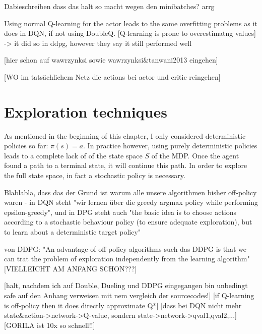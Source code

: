 Dabieschreiben dass das halt so macht wegen den minibatches? arrg

Using normal Q-learning for the actor leads to the same overfitting problems as it does in DQN, if not using DoubleQ. [Q-learning is prone to overestimatng values] -> it did so in ddpg, however they say it still performed well

[hier schon auf wawrzynksi sowie wawrzynksi\&tanwani2013 eingehen]

[WO im tatsächlichem Netz die actions bei actor und critic reingehen]


\section{Exploration techniques}

As mentioned in the beginning of this chapter, I only considered deterministic policies so far: $\pi(s) = a$. In practice however, using purely deterministic policies leads to a complete lack of  of the state space $S$ of the MDP. Once the agent found a path to a terminal state, it will continue  this path. In order to explore the full state space, in fact a stochastic policy is necessary.

Blablabla, dass das der Grund ist warum alle unsere algorithmen bisher off-policy waren - in DQN steht "wir lernen über die greedy argmax policy while performing epsilon-greedy", und in DPG steht auch "the basic idea is to choose actions according to a stochastic behaviour policy (to ensure adequate exploration), but to learn about a deterministic target policy"

von DDPG: "An advantage of off-policy algorithms such das DDPG is that we can trat the problem of exploration independently from the learning algorithm" [VIELLEICHT AM ANFANG SCHON???]



[halt, nachdem ich auf Double, Dueling und DDPG eingegangen bin unbedingt safe auf den Anhang verweisen mit nem vergleich der sourcecodes!]
[if Q-learning is off-policy then it does directly approximate Q*]
[dass bei DQN nicht mehr state\&action->network->Q-value, sondern state->network->qval1,qval2,...]
[GORILA ist 10x so schnell!!]